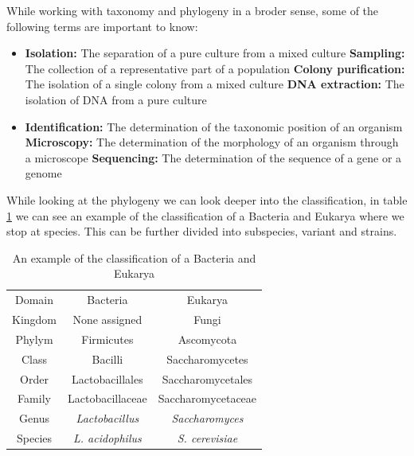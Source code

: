 While working with taxonomy and phylogeny in a broder sense, some of the following terms are important to know:

\begin{highlight}
    \begin{itemize}
        \item \textbf{Isolation:} The separation of a pure culture from a mixed culture
        \subitem \textbf{Sampling:} The collection of a representative part of a population
        \subitem \textbf{Colony purification:} The isolation of a single colony from a mixed culture
        \subitem \textbf{DNA extraction:} The isolation of DNA from a pure culture
        \item \textbf{Identification:} The determination of the taxonomic position of an organism
        \subitem \textbf{Microscopy:} The determination of the morphology of an organism through a microscope
        \subitem \textbf{Sequencing:} The determination of the sequence of a gene or a genome
    \end{itemize}
\end{highlight}

While looking at the phylogeny we can look deeper into the classification, in table \ref*{tab:ClassificationPhylogeny} we can see an example of the classification of a Bacteria and Eukarya where we stop at species. This can be further divided into subspecies, variant and strains.

\begin{table}[h]
    \centering
    \caption{An example of the classification of a Bacteria and Eukarya}
    \label{tab:ClassificationPhylogeny}
    \begin{tabular}{c|c|c}
        Domain & Bacteria & Eukarya \\
        Kingdom & None assigned & Fungi \\
        Phylym & Firmicutes & Ascomycota \\
        Class & Bacilli & Saccharomycetes \\
        Order & Lactobacillales & Saccharomycetales \\
        Family & Lactobacillaceae & Saccharomycetaceae \\
        Genus & \textit{Lactobacillus} & \textit{Saccharomyces} \\
        Species & \textit{L. acidophilus} & \textit{S. cerevisiae} \\
    \end{tabular}    
\end{table}

